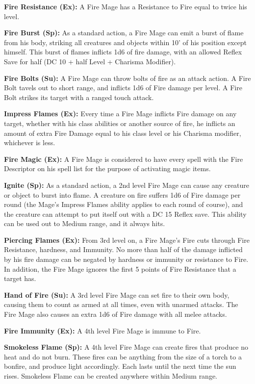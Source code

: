 \textbf{Fire Resistance (Ex):} A Fire Mage has a Resistance to Fire equal to twice his level.

\textbf{Fire Burst (Sp):} As a standard action, a Fire Mage can emit a burst of flame from his body, striking all creatures and objects within 10' of his position except himself. This burst of flames inflicts 1d6 of fire damage, with an allowed Reflex Save for half (DC 10 + half Level + Charisma Modifier).

\textbf{Fire Bolts (Su):} A Fire Mage can throw bolts of fire as an attack action. A Fire Bolt tavels out to short range, and inflicts 1d6 of Fire damage per level. A Fire Bolt strikes its target with a ranged touch attack.

\textbf{Impress Flames (Ex):} Every time a Fire Mage inflicts Fire damage on any target, whether with his class abilities or another source of fire, he inflicts an amount of extra Fire Damage equal to his class level or his Charisma modifier, whichever is less.

\textbf{Fire Magic (Ex):} A Fire Mage is considered to have every spell with the Fire Descriptor on his spell list for the purpose of activating magic items.

\textbf{Ignite (Sp):} As a standard action, a 2nd level Fire Mage can cause any creature or object to burst into flame. A creature on fire suffers 1d6 of Fire damage per round (the Mage's Impress Flames ability applies to each round of course), and the creature can attempt to put itself out with a DC 15 Reflex save. This ability can be used out to Medium range, and it always hits.

\textbf{Piercing Flames (Ex):} From 3rd level on, a Fire Mage's Fire cuts through Fire Resistance, hardness, and Immunity. No more than half of the damage inflicted by his fire damage can be negated by hardness or immunity or resistance to Fire. In addition, the Fire Mage ignores the first 5 points of Fire Resistance that a target has.

\textbf{Hand of Fire (Su):} A 3rd level Fire Mage can set fire to their own body, causing them to count as armed at all times, even with unarmed attacks. The Fire Mage also causes an extra 1d6 of Fire damage with all melee attacks.

\textbf{Fire Immunity (Ex):} A 4th level Fire Mage is immune to Fire.

\textbf{Smokeless Flame (Sp):} A 4th level Fire Mage can create fires that produce no heat and do not burn. These fires can be anything from the size of a torch to a bonfire, and produce light accordingly. Each lasts until the next time the sun rises. Smokeless Flame can be created anywhere within Medium range.


